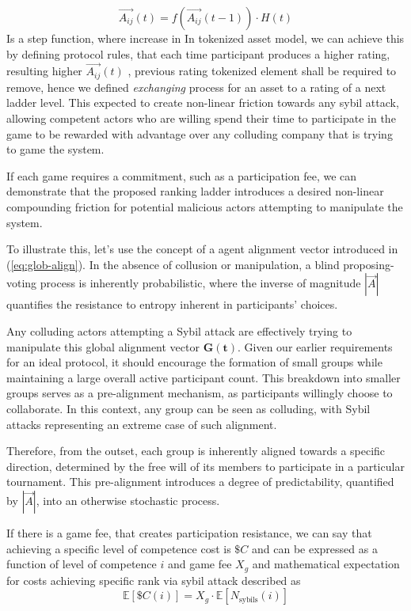 \documentclass{article}
\begin{document}
\begin{CJK}{UTF8}{gbsn}
\begin{multicols}{2}
        \begin{equation}
            \vec{A_{ij}}(t) = f(\vec{A_{ij}}(t-1)) \cdot H(t)
        \end{equation}
        Is a step function, where increase in
        In tokenized asset model, we can achieve this by defining protocol rules, that each time participant produces a higher rating, resulting higher $\vec{A_{ij}}(t)$ , previous rating tokenized element shall be required to remove, hence we defined \textit{exchanging} process for an asset to a rating of a next ladder level. This expected to create non-linear friction towards any sybil attack, allowing competent actors who are willing spend their time to participate in the game to be rewarded with advantage over any colluding company that is trying to game the system. 

        If each game requires a commitment, such as a participation fee, we can demonstrate that the proposed ranking ladder introduces a desired non-linear compounding friction for potential malicious actors attempting to manipulate the system.

        To illustrate this, let's use the concept of a agent alignment vector introduced in (\ref*{eq:glob-align}). In the absence of collusion or manipulation, a blind proposing-voting process is inherently probabilistic, where the inverse of magnitude $|\vec{A}|$ quantifies the resistance to entropy inherent in participants' choices.


        Any colluding actors attempting a Sybil attack are effectively trying to manipulate this global alignment vector $\mathbf{G(t)}$. Given our earlier requirements for an ideal protocol, it should encourage the formation of small groups while maintaining a large overall active participant count. This breakdown into smaller groups serves as a pre-alignment mechanism, as participants willingly choose to collaborate. In this context, any group can be seen as colluding, with Sybil attacks representing an extreme case of such alignment.

        Therefore, from the outset, each group is inherently aligned towards a specific direction, determined by the free will of its members to participate in a particular tournament. This pre-alignment introduces a degree of predictability, quantified by $|\vec{A}|$, into an otherwise stochastic process.


        If there is a game fee, that creates participation resistance, we can say that achieving a specific level of competence cost is $\$C$ and can be expressed as a function of level of competence $i$ and game fee $X_g$ and mathematical expectation for costs achieving specific rank via sybil attack described as
        $$\mathbb{E}[\$C(i)] = X_g \cdot \mathbb{E}[N_{\text{sybils}}(i)]$$


\end{multicols}
\end{CJK}
\end{document}
